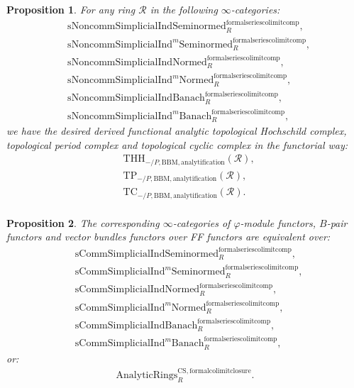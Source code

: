 \documentclass[12pt]{book}
\newtheorem{proposition}{Proposition}
\begin{document}
\begin{proposition}
For any ring $\mathcal{R}$ in the following $\infty$-categories:
\begin{align}
&\mathrm{sNoncomm}\mathrm{Simplicial}\mathrm{Ind}\mathrm{Seminormed}^\mathrm{formalseriescolimitcomp}_R,\\
&\mathrm{sNoncomm}\mathrm{Simplicial}\mathrm{Ind}^m\mathrm{Seminormed}^\mathrm{formalseriescolimitcomp}_R,\\
&\mathrm{sNoncomm}\mathrm{Simplicial}\mathrm{Ind}\mathrm{Normed}^\mathrm{formalseriescolimitcomp}_R,\\
&\mathrm{sNoncomm}\mathrm{Simplicial}\mathrm{Ind}^m\mathrm{Normed}^\mathrm{formalseriescolimitcomp}_R,\\
&\mathrm{sNoncomm}\mathrm{Simplicial}\mathrm{Ind}\mathrm{Banach}^\mathrm{formalseriescolimitcomp}_R,\\
&\mathrm{sNoncomm}\mathrm{Simplicial}\mathrm{Ind}^m\mathrm{Banach}^\mathrm{formalseriescolimitcomp}_R,	
\end{align}	
we have the desired derived functional analytic topological Hochschild complex, topological period complex and topological cyclic complex in the functorial way:
\begin{align}
&\mathrm{THH}_{-/P,\mathrm{BBM},\mathrm{analytification}}(\mathcal{R}),\\
&\mathrm{TP}_{-/P,\mathrm{BBM},\mathrm{analytification}}(\mathcal{R}),\\
&\mathrm{TC}_{-/P,\mathrm{BBM},\mathrm{analytification}}(\mathcal{R}).\\
\end{align}
\end{proposition}



\begin{proposition}
The corresponding $\infty$-categories of $\varphi$-module functors, $B$-pair functors and vector bundles functors over FF functors are equivalent over:
\begin{align}
&\mathrm{sComm}\mathrm{Simplicial}\mathrm{Ind}\mathrm{Seminormed}^\mathrm{formalseriescolimitcomp}_R,\\
&\mathrm{sComm}\mathrm{Simplicial}\mathrm{Ind}^m\mathrm{Seminormed}^\mathrm{formalseriescolimitcomp}_R,\\
&\mathrm{sComm}\mathrm{Simplicial}\mathrm{Ind}\mathrm{Normed}^\mathrm{formalseriescolimitcomp}_R,\\
&\mathrm{sComm}\mathrm{Simplicial}\mathrm{Ind}^m\mathrm{Normed}^\mathrm{formalseriescolimitcomp}_R,\\
&\mathrm{sComm}\mathrm{Simplicial}\mathrm{Ind}\mathrm{Banach}^\mathrm{formalseriescolimitcomp}_R,\\
&\mathrm{sComm}\mathrm{Simplicial}\mathrm{Ind}^m\mathrm{Banach}^\mathrm{formalseriescolimitcomp}_R,	
\end{align}
or:
\begin{align}
\mathrm{AnalyticRings}^\mathrm{CS,formalcolimitclosure}_R.	
\end{align}	
\end{proposition}
\end{document}
